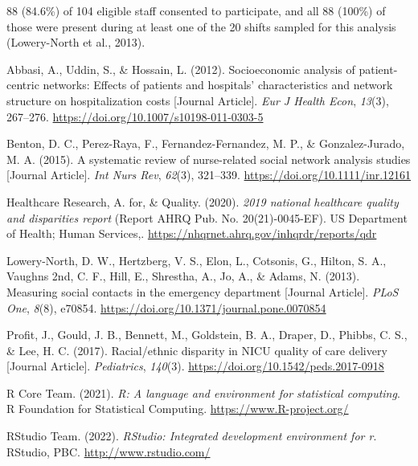 \documentclass[
]{article}
\newlength{\cslhangindent}
\newlength{\cslentryspacingunit} %
\newenvironment{CSLReferences}[2] %
 {%
  \setlength{\parindent}{0pt}
  \ifodd #1
  \let\oldpar\par
  \def\par{\hangindent=\cslhangindent\oldpar}
  \fi
  \setlength{\parskip}{#2\cslentryspacingunit}
 }%
 {}
\begin{document}
88 (84.6\%) of 104 eligible staff consented to participate, and all 88
(100\%) of those were present during at least one of the 20 shifts
sampled for this analysis (Lowery-North et al., 2013).

\hypertarget{refs}{}
\begin{CSLReferences}{1}{0}
\leavevmode{}%
Abbasi, A., Uddin, S., \& Hossain, L. (2012). Socioeconomic analysis of
patient-centric networks: Effects of patients and hospitals'
characteristics and network structure on hospitalization costs
{[}Journal Article{]}. \emph{Eur J Health Econ}, \emph{13}(3), 267--276.
\url{https://doi.org/10.1007/s10198-011-0303-5}

\leavevmode{}%
Benton, D. C., Perez-Raya, F., Fernandez-Fernandez, M. P., \&
Gonzalez-Jurado, M. A. (2015). A systematic review of nurse-related
social network analysis studies {[}Journal Article{]}. \emph{Int Nurs
Rev}, \emph{62}(3), 321--339. \url{https://doi.org/10.1111/inr.12161}

\leavevmode{}%
Healthcare Research, A. for, \& Quality. (2020). \emph{2019 national
healthcare quality and disparities report} (Report AHRQ Pub. No.
20(21)-0045-EF). US Department of Health; Human Services,.
\url{https://nhqrnet.ahrq.gov/inhqrdr/reports/qdr}

\leavevmode{}%
Lowery-North, D. W., Hertzberg, V. S., Elon, L., Cotsonis, G., Hilton,
S. A., Vaughns 2nd, C. F., Hill, E., Shrestha, A., Jo, A., \& Adams, N.
(2013). Measuring social contacts in the emergency department {[}Journal
Article{]}. \emph{PLoS One}, \emph{8}(8), e70854.
\url{https://doi.org/10.1371/journal.pone.0070854}

\leavevmode{}%
Profit, J., Gould, J. B., Bennett, M., Goldstein, B. A., Draper, D.,
Phibbs, C. S., \& Lee, H. C. (2017). Racial/ethnic disparity in NICU
quality of care delivery {[}Journal Article{]}. \emph{Pediatrics},
\emph{140}(3). \url{https://doi.org/10.1542/peds.2017-0918}

\leavevmode{}%
R Core Team. (2021). \emph{R: A language and environment for statistical
computing}. R Foundation for Statistical Computing.
\url{https://www.R-project.org/}

\leavevmode{}%
RStudio Team. (2022). \emph{RStudio: Integrated development environment
for r}. RStudio, PBC. \url{http://www.rstudio.com/}


\end{CSLReferences}
\end{document}
